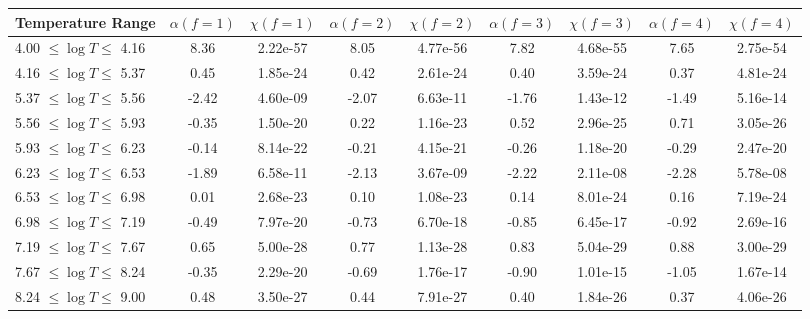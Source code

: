\begin{tabular}{lcccccccc}
\toprule
Temperature Range & $\alpha(f = 1)$ & $\chi(f = 1)$ & $\alpha(f = 2)$ & $\chi(f = 2)$ & $\alpha(f = 3)$ & $\chi(f = 3)$ & $\alpha(f = 4)$ & $\chi(f = 4)$ \\
\midrule
4.00 $\leq \log T \leq$ 4.16 & 8.36 & 2.22e-57 & 8.05 & 4.77e-56 & 7.82 & 4.68e-55 & 7.65 & 2.75e-54 \\
4.16 $\leq \log T \leq$ 5.37 & 0.45 & 1.85e-24 & 0.42 & 2.61e-24 & 0.40 & 3.59e-24 & 0.37 & 4.81e-24 \\
5.37 $\leq \log T \leq$ 5.56 & -2.42 & 4.60e-09 & -2.07 & 6.63e-11 & -1.76 & 1.43e-12 & -1.49 & 5.16e-14 \\
5.56 $\leq \log T \leq$ 5.93 & -0.35 & 1.50e-20 & 0.22 & 1.16e-23 & 0.52 & 2.96e-25 & 0.71 & 3.05e-26 \\
5.93 $\leq \log T \leq$ 6.23 & -0.14 & 8.14e-22 & -0.21 & 4.15e-21 & -0.26 & 1.18e-20 & -0.29 & 2.47e-20 \\
6.23 $\leq \log T \leq$ 6.53 & -1.89 & 6.58e-11 & -2.13 & 3.67e-09 & -2.22 & 2.11e-08 & -2.28 & 5.78e-08 \\
6.53 $\leq \log T \leq$ 6.98 & 0.01 & 2.68e-23 & 0.10 & 1.08e-23 & 0.14 & 8.01e-24 & 0.16 & 7.19e-24 \\
6.98 $\leq \log T \leq$ 7.19 & -0.49 & 7.97e-20 & -0.73 & 6.70e-18 & -0.85 & 6.45e-17 & -0.92 & 2.69e-16 \\
7.19 $\leq \log T \leq$ 7.67 & 0.65 & 5.00e-28 & 0.77 & 1.13e-28 & 0.83 & 5.04e-29 & 0.88 & 3.00e-29 \\
7.67 $\leq \log T \leq$ 8.24 & -0.35 & 2.29e-20 & -0.69 & 1.76e-17 & -0.90 & 1.01e-15 & -1.05 & 1.67e-14 \\
8.24 $\leq \log T \leq$ 9.00 & 0.48 & 3.50e-27 & 0.44 & 7.91e-27 & 0.40 & 1.84e-26 & 0.37 & 4.06e-26 \\
\bottomrule
\end{tabular}
